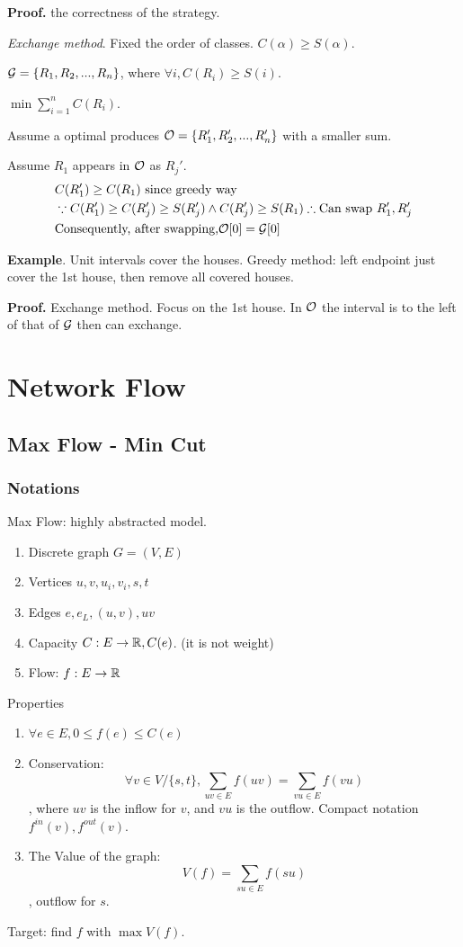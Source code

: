 \documentclass[a4paper]{report}
\theoremstyle{definition}
\begin{document}
\textbf{Proof.} the correctness of the strategy.

\textit{Exchange method}. Fixed the order of classes.
$C(\alpha)\geq S(\alpha)$.

$\mathcal{G}=\{R_1,R_2, ..., R_n\}$, where $\forall i, C(R_i)\geq S(i)$.

$\min \sum_{i=1}^n C(R_i)$.

Assume a optimal produces $\mathcal{O}=\{R_1', R_2', ..., R_n'\}$ with a smaller sum.

Assume $R_1$ appears in $\mathcal{O}$ as $R_j'$.
\begin{align*}
& C(R'_1)\geq C(R_1) \text{ since greedy way}\\
& \because C(R'_1)\geq C(R_j') \geq S(R_j') \wedge C(R_j')\geq S(R_1) \therefore \text{Can swap } R_1',  R_j'\\
& \text{Consequently, after swapping,}  \mathcal{O}[0]=\mathcal{G}[0]
\end{align*}

\textbf{Example}.
Unit intervals cover the houses. Greedy method: left endpoint just cover the 1st house, then remove all covered houses.

\textbf{Proof.} Exchange method. Focus on the 1st house. In $\mathcal{O}$ the interval is to the left of that of $\mathcal{G}$ then can exchange.

\chapter{Network Flow}
\section{Max Flow - Min Cut}
\subsection{Notations}
Max Flow: highly abstracted model.
\begin{enumerate}
\item Discrete graph $G=(V,E)$
\item Vertices $u, v, u_i, v_i, s, t$
\item Edges $e, e_L, (u,v), uv$
\item Capacity $C: E\rightarrow \mathbb{R}, C(e)$. (it is not weight)
\item Flow: $f: E\rightarrow \mathbb{R}$
\end{enumerate}
Properties
\begin{enumerate}
\item $\forall e \in E, 0\leq f(e)\leq C(e)$
\item Conservation: $$\forall v\in V/\{s,t\}, \sum_{uv\in E}f(uv)=\sum_{vu\in E}f(vu)$$
, where $uv$ is the inflow for $v$, and $vu$ is the outflow. Compact notation $f^{in}(v), f^{out}(v)$.
\item The Value of the graph:
$$V(f) = \sum_{su\in E}f(su)$$
, outflow for $s$.
\end{enumerate}
Target: find $f$ with $\max V(f)$.
\end{document}
